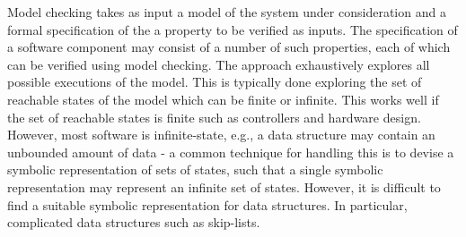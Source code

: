 Model checking takes as input a model of the system under
consideration and a formal specification of the a property to be verified as inputs. The specification of a software component may consist of a number of such properties, each of which can be verified using model checking. The approach exhaustively explores all possible executions of the model. This is typically done exploring the set of reachable states of the model  which can be finite or infinite. 
This works well if the set of reachable states is finite such as controllers and hardware design.  However, most software is infinite-state, e.g., a data structure may contain an unbounded amount of data - a common technique for handling this is to devise a symbolic representation of sets of states, such that a single symbolic representation may represent an infinite set of states. However, it is difficult to find a suitable symbolic representation for data structures. In particular, complicated data structures such as skip-lists.


